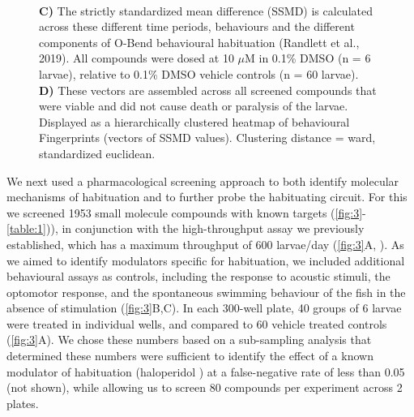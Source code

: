\documentclass[9pt,lineno]{RandlettLab_elife}
\begin{document}
\begin{figure}
\begin{fullwidth}
\begin{center}
{\\ \textbf{C)} The strictly standardized mean difference (SSMD) is calculated across these different time periods, behaviours and the different components of O-Bend behavioural habituation (Randlett et al., 2019). All compounds were dosed at 10 $\mu$M in 0.1\% DMSO (n = 6 larvae), relative to 0.1\% DMSO vehicle controls (n = 60 larvae). 
\\ \textbf{D)} These vectors are assembled across all screened compounds that were viable and did not cause death or paralysis of the larvae. Displayed as a hierarchically clustered heatmap of behavioural Fingerprints (vectors of SSMD values). Clustering distance = ward, standardized euclidean. }
\label{fig:3}

\label{table:1}

\label{table:2}

\label{table:3}

\end{center}
\end{fullwidth}
\end{figure}


We next used a pharmacological screening approach to both identify molecular mechanisms of habituation and to further probe the habituating circuit. For this we screened 1953 small molecule compounds with known targets (\autoref{fig:3}-\autoref{table:1})), in conjunction with the high-throughput assay we previously established, which has a maximum throughput of 600 larvae/day (\autoref{fig:3}A, \citep{Randlett2019-fi}). As we aimed to identify modulators specific for habituation, we included additional behavioural assays as controls, including the response to acoustic stimuli, the optomotor response, and the spontaneous swimming behaviour of the fish in the absence of stimulation (\autoref{fig:3}B,C). In each 300-well plate, 40 groups of 6 larvae were treated in individual wells, and compared to 60 vehicle treated controls (\autoref{fig:3}A). We chose these numbers based on a sub-sampling analysis that determined these numbers were sufficient to identify the effect of a known modulator of habituation (haloperidol \citep{Randlett2019-fi}) at a false-negative rate of less than 0.05 (not shown), while allowing us to screen 80 compounds per experiment across 2 plates.
\end{document}
